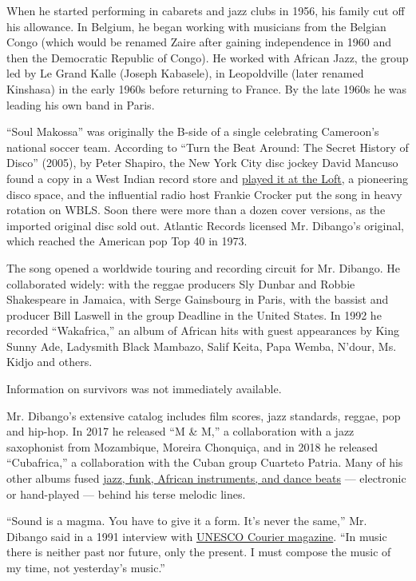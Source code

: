 When he started performing in cabarets and jazz clubs in 1956, his
family cut off his allowance. In Belgium, he began working with
musicians from the Belgian Congo (which would be renamed Zaire after
gaining independence in 1960 and then the Democratic Republic of Congo).
He worked with African Jazz, the group led by Le Grand Kalle (Joseph
Kabasele), in Leopoldville (later renamed Kinshasa) in the early 1960s
before returning to France. By the late 1960s he was leading his own
band in Paris.

``Soul Makossa'' was originally the B-side of a single celebrating
Cameroon's national soccer team. According to ``Turn the Beat Around:
The Secret History of Disco'' (2005), by Peter Shapiro, the New York
City disc jockey David Mancuso found a copy in a West Indian record
store and
\href{https://www.nytimes3xbfgragh.onion/2020/02/13/arts/music/love-saves-the-day-loft-playlist.html}{played
it at the Loft}, a pioneering disco space, and the influential radio
host Frankie Crocker put the song in heavy rotation on WBLS. Soon there
were more than a dozen cover versions, as the imported original disc
sold out. Atlantic Records licensed Mr. Dibango's original, which
reached the American pop Top 40 in 1973.

The song opened a worldwide touring and recording circuit for Mr.
Dibango. He collaborated widely: with the reggae producers Sly Dunbar
and Robbie Shakespeare in Jamaica, with Serge Gainsbourg in Paris, with
the bassist and producer Bill Laswell in the group Deadline in the
United States. In 1992 he recorded ``Wakafrica,'' an album of African
hits with guest appearances by King Sunny Ade, Ladysmith Black Mambazo,
Salif Keita, Papa Wemba, N'dour, Ms. Kidjo and others.

Information on survivors was not immediately available.

Mr. Dibango's extensive catalog includes film scores, jazz standards,
reggae, pop and hip-hop. In 2017 he released ``M \& M,'' a collaboration
with a jazz saxophonist from Mozambique, Moreira Chonquiça, and in 2018
he released ``Cubafrica,'' a collaboration with the Cuban group Cuarteto
Patria. Many of his other albums fused
\href{https://www.youtube.com/watch?\&v=zK69LoCTYus}{jazz, funk, African
instruments, and dance beats} --- electronic or hand-played --- behind
his terse melodic lines.

``Sound is a magma. You have to give it a form. It's never the same,''
Mr. Dibango said in a 1991 interview with
\href{https://en.unesco.org/courier/march-1991/interview-manu-dibango}{UNESCO
Courier magazine}. ``In music there is neither past nor future, only the
present. I must compose the music of my time, not yesterday's music.''

